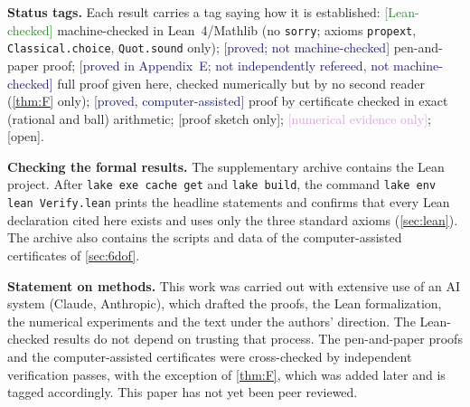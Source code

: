 \documentclass[11pt]{article}
\newif\ifshare
\newif\ifshowstatus
\theoremstyle{plain}
\theoremstyle{definition}
\theoremstyle{remark}
\begin{document}
\ifshare
\begin{tcolorbox}[colback=gray!5,colframe=gray!60,title={\sffamily How to read and check this paper}]
\small \textbf{Status tags.} Each result carries a tag saying how it is established:
\textcolor{ForestGreen}{\textsf{[Lean-checked]}} machine-checked in Lean~4/Mathlib (no \texttt{sorry}; axioms \texttt{propext},
\texttt{Classical.choice}, \texttt{Quot.sound} only);
\textcolor{MidnightBlue}{\textsf{[proved; not machine-checked]}} pen-and-paper proof;
\textcolor{MidnightBlue}{\textsf{[proved in Appendix~E; not independently refereed, not machine-checked]}} full proof given here, checked
numerically but by no second reader (\cref{thm:F} only);
\textcolor{MidnightBlue}{\textsf{[proved, computer-assisted]}} proof by certificate checked in exact (rational and ball) arithmetic;
\textcolor{BurntOrange}{\textsf{[proof sketch only]}};
\textcolor{Plum}{\textsf{[numerical evidence only]}}; \textcolor{BrickRed}{\textsf{[open]}}.

\textbf{Checking the formal results.} The supplementary archive contains the Lean project. After \texttt{lake exe cache get} and
\texttt{lake build}, the command \texttt{lake env lean Verify.lean} prints the headline statements and confirms that every Lean
declaration cited here exists and uses only the three standard axioms (\cref{sec:lean}). The archive also contains the scripts and
data of the computer-assisted certificates of \cref{sec:6dof}.

\textbf{Statement on methods.} This work was carried out with extensive use of an AI system (Claude, Anthropic), which drafted the
proofs, the Lean formalization, the numerical experiments and the text under the authors' direction. The Lean-checked results do
not depend on trusting that process. The pen-and-paper proofs and the computer-assisted certificates were cross-checked by
independent verification passes, with the exception of \cref{thm:F}, which was added later and is tagged accordingly. This paper has
not yet been peer reviewed.
\end{tcolorbox}
\else\ifshowstatus
\end{document}
